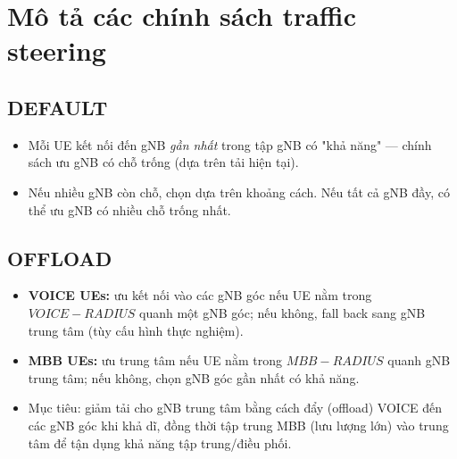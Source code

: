 \section{Mô tả các chính sách traffic steering}

\subsection{DEFAULT}
\begin{itemize}
\item Mỗi UE kết nối đến gNB \emph{gần nhất} trong tập gNB có "khả năng" — chính sách ưu gNB có chỗ trống (dựa trên tải hiện tại).
\item Nếu nhiều gNB còn chỗ, chọn dựa trên khoảng cách. Nếu tất cả gNB đầy, có thể ưu gNB có nhiều chỗ trống nhất.
\end{itemize}

\subsection{OFFLOAD}
\begin{itemize}
\item \textbf{VOICE UEs:} ưu kết nối vào các gNB góc nếu UE nằm trong $VOICE-RADIUS$ quanh một gNB góc; nếu không, fall back sang gNB trung tâm (tùy cấu hình thực nghiệm).
\item \textbf{MBB UEs:} ưu trung tâm nếu UE nằm trong $MBB-RADIUS$ quanh gNB trung tâm; nếu không, chọn gNB góc gần nhất có khả năng.
\item Mục tiêu: giảm tải cho gNB trung tâm bằng cách đẩy (offload) VOICE đến các gNB góc khi khả dĩ, đồng thời tập trung MBB (lưu lượng lớn) vào trung tâm để tận dụng khả năng tập trung/điều phối.
\end{itemize}